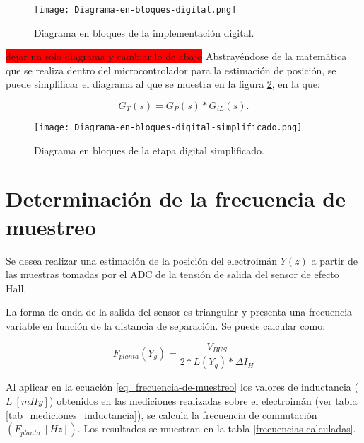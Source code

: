 \begin{figure}[H]
	\centering
	\texttt{[image: Diagrama-en-bloques-digital.png]}
	\caption{Diagrama en bloques de la implementación digital.}
	\label{fig:diag-en-bloques-digital}
\end{figure}
\colorbox{red}{dejar un solo diagrama y cambiar lo de abajo}
\noindent Abstrayéndose de la matemática que se realiza dentro del microcontrolador para la estimación de posición, se puede simplificar el diagrama al que se muestra en la figura \ref{fig:diag-en-bloques-digital-simplif}, en la que:

\begin{equation} 
	G_T(s) = G_P(s) * G_{iL}(s).
\end{equation}

\begin{figure}[H]
	\centering
	\texttt{[image: Diagrama-en-bloques-digital-simplificado.png]}
	\caption{Diagrama en bloques de la etapa digital simplificado.}
	\label{fig:diag-en-bloques-digital-simplif}
\end{figure}


\section{Determinación de la frecuencia de muestreo}

\noindent Se desea realizar una estimación de la posición del electroimán $Y(z)$  a partir de las muestras tomadas por el ADC de la tensión de salida del sensor de efecto Hall.

\noindent La forma de onda de la salida del sensor es triangular y presenta una frecuencia variable en función de la distancia de separación. Se puede calcular como:

\begin{equation} \label{eq_frecuencia-de-muestreo}
	F_{planta}(Y_g)=\frac{V_{BUS}}{2 * L(Y_g) * \Delta I_H}
\end{equation}


 Al aplicar en la ecuación \ref{eq_frecuencia-de-muestreo} los valores de inductancia ($L\:[mHy]$) obtenidos en las mediciones realizadas sobre el electroimán (ver tabla \ref{tab_mediciones_inductancia}), se calcula la frecuencia de conmutación  $(F_{planta}\:[Hz])$. Los resultados se muestran en la tabla \ref{frecuencias-calculadas}.



